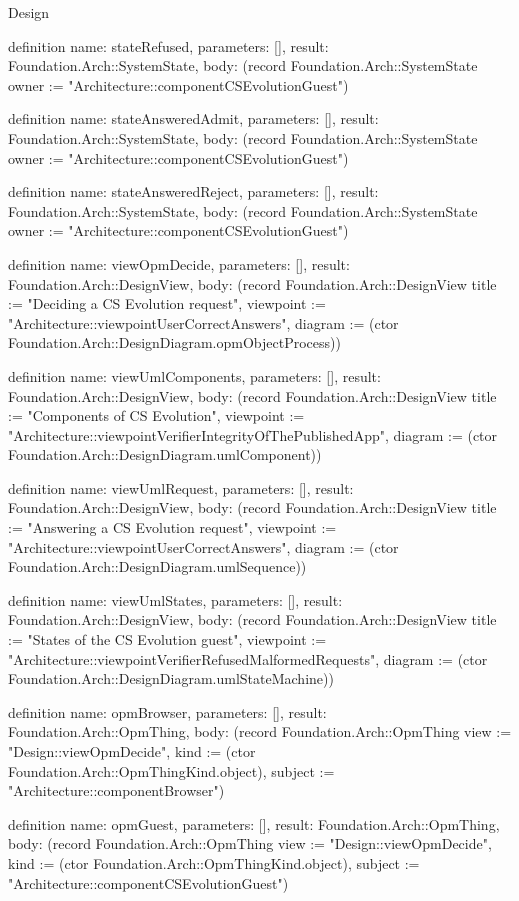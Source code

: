 \begin{lexlean}{Design}
\begin{semanticmodule}
definition{
  name: stateRefused,
  parameters: [],
  result: Foundation.Arch::SystemState,
  body: (record Foundation.Arch::SystemState {owner := "Architecture::componentCSEvolutionGuest"})
}

definition{
  name: stateAnsweredAdmit,
  parameters: [],
  result: Foundation.Arch::SystemState,
  body: (record Foundation.Arch::SystemState {owner := "Architecture::componentCSEvolutionGuest"})
}

definition{
  name: stateAnsweredReject,
  parameters: [],
  result: Foundation.Arch::SystemState,
  body: (record Foundation.Arch::SystemState {owner := "Architecture::componentCSEvolutionGuest"})
}

definition{
  name: viewOpmDecide,
  parameters: [],
  result: Foundation.Arch::DesignView,
  body: (record Foundation.Arch::DesignView {title := "Deciding a CS Evolution request", viewpoint := "Architecture::viewpointUserCorrectAnswers", diagram := (ctor Foundation.Arch::DesignDiagram.opmObjectProcess)})
}

definition{
  name: viewUmlComponents,
  parameters: [],
  result: Foundation.Arch::DesignView,
  body: (record Foundation.Arch::DesignView {title := "Components of CS Evolution", viewpoint := "Architecture::viewpointVerifierIntegrityOfThePublishedApp", diagram := (ctor Foundation.Arch::DesignDiagram.umlComponent)})
}

definition{
  name: viewUmlRequest,
  parameters: [],
  result: Foundation.Arch::DesignView,
  body: (record Foundation.Arch::DesignView {title := "Answering a CS Evolution request", viewpoint := "Architecture::viewpointUserCorrectAnswers", diagram := (ctor Foundation.Arch::DesignDiagram.umlSequence)})
}

definition{
  name: viewUmlStates,
  parameters: [],
  result: Foundation.Arch::DesignView,
  body: (record Foundation.Arch::DesignView {title := "States of the CS Evolution guest", viewpoint := "Architecture::viewpointVerifierRefusedMalformedRequests", diagram := (ctor Foundation.Arch::DesignDiagram.umlStateMachine)})
}

definition{
  name: opmBrowser,
  parameters: [],
  result: Foundation.Arch::OpmThing,
  body: (record Foundation.Arch::OpmThing {view := "Design::viewOpmDecide", kind := (ctor Foundation.Arch::OpmThingKind.object), subject := "Architecture::componentBrowser"})
}

definition{
  name: opmGuest,
  parameters: [],
  result: Foundation.Arch::OpmThing,
  body: (record Foundation.Arch::OpmThing {view := "Design::viewOpmDecide", kind := (ctor Foundation.Arch::OpmThingKind.object), subject := "Architecture::componentCSEvolutionGuest"})
}


\end{semanticmodule}
\end{lexlean}
